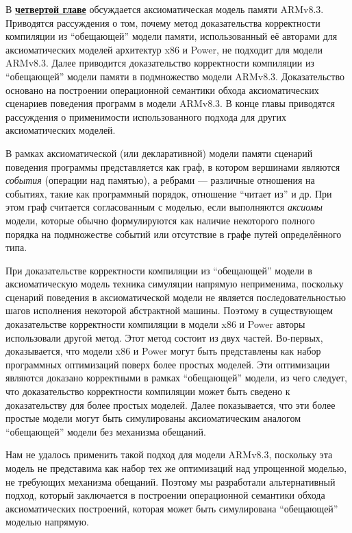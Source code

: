 В \underline{\textbf{четвертой главе}} обсуждается аксиоматическая модель памяти ARMv8.3.
Приводятся рассуждения о том, почему метод доказательства корректности компиляции из
``обещающей'' модели памяти, использованный её авторами для аксиоматических моделей архитектур x86 и Power,
не подходит для модели ARMv8.3. Далее приводится доказательство корректности компиляции из ``обещающей'' модели
памяти в подмножество модели ARMv8.3. Доказательство основано на построении операционной семантики обхода аксиоматических сценариев
поведения программ в модели ARMv8.3. В конце главы приводятся рассуждения о применимости использованного подхода для других
аксиоматических моделей.

В рамках аксиоматической (или декларативной) модели памяти сценарий поведения программы представляется как граф, в котором вершинами
являются \emph{события} (операции над памятью), а ребрами --- различные отношения на событиях, такие как программный
порядок, отношение ``читает из'' и др. При этом граф считается согласованным с моделью, если выполняются \emph{аксиомы} модели,
которые обычно формулируются как наличие некоторого полного порядка на подмножестве событий или отсутствие  в графе путей определённого
типа.

При доказательстве корректности компиляции из ``обещающей'' модели в аксиоматическую модель техника симуляции напрямую
неприменима, поскольку сценарий поведения в аксиоматической модели не является последовательностью шагов исполнения некоторой абстрактной машины.
Поэтому в существующем доказательстве корректности компиляции в 
модели x86 и Power авторы использовали другой метод. Этот метод состоит из двух частей.
Во-первых, доказывается, что модели x86 и Power могут быть представлены как набор программных оптимизаций поверх
более простых моделей. Эти оптимизации являются доказано корректными в рамках ``обещающей'' модели, из чего следует,
что доказательство корректности компиляции может быть сведено к доказательству для более простых моделей.
Далее показывается, что эти более простые модели могут быть симулированы аксиоматическим аналогом
``обещающей'' модели без механизма обещаний.

Нам не удалось применить такой подход для модели ARMv8.3, поскольку эта модель не представима как набор тех же
оптимизаций над упрощенной моделью, не требующих механизма обещаний. Поэтому мы разработали альтернативный подход,
который заключается в построении операционной семантики обхода аксиоматических построений, которая может быть
симулирована ``обещающей'' моделью напрямую.

